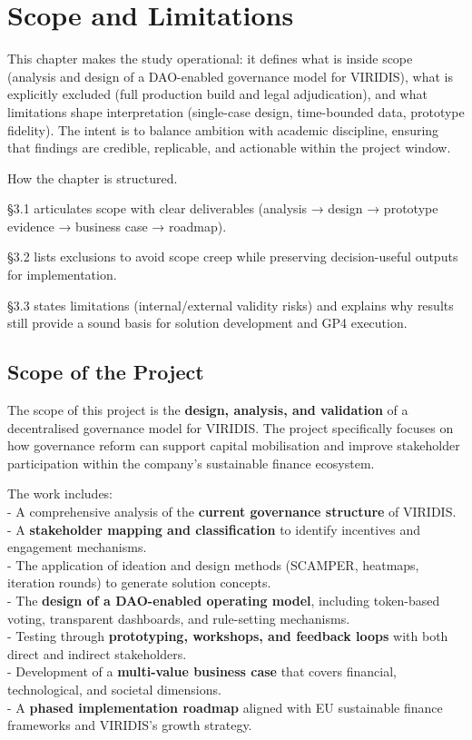 \documentclass[
  english,
  12pt,
  oneside,
  open=any]{scrbook}
\begin{document}
\chapter{Scope and Limitations}\label{sec-scope}

This chapter makes the study operational: it defines what is inside
scope (analysis and design of a DAO-enabled governance model for
VIRIDIS), what is explicitly excluded (full production build and legal
adjudication), and what limitations shape interpretation (single-case
design, time-bounded data, prototype fidelity). The intent is to balance
ambition with academic discipline, ensuring that findings are credible,
replicable, and actionable within the project window.

How the chapter is structured.

§3.1 articulates scope with clear deliverables (analysis → design →
prototype evidence → business case → roadmap).

§3.2 lists exclusions to avoid scope creep while preserving
decision-useful outputs for implementation.

§3.3 states limitations (internal/external validity risks) and explains
why results still provide a sound basis for solution development and GP4
execution.

\section{Scope of the Project}\label{sec-in}

The scope of this project is the \textbf{design, analysis, and
validation} of a decentralised governance model for VIRIDIS. The project
specifically focuses on how governance reform can support capital
mobilisation and improve stakeholder participation within the company's
sustainable finance ecosystem.

The work includes:\\
- A comprehensive analysis of the \textbf{current governance structure}
of VIRIDIS.\\
- A \textbf{stakeholder mapping and classification} to identify
incentives and engagement mechanisms.\\
- The application of ideation and design methods (SCAMPER, heatmaps,
iteration rounds) to generate solution concepts.\\
- The \textbf{design of a DAO-enabled operating model}, including
token-based voting, transparent dashboards, and rule-setting
mechanisms.\\
- Testing through \textbf{prototyping, workshops, and feedback loops}
with both direct and indirect stakeholders.\\
- Development of a \textbf{multi-value business case} that covers
financial, technological, and societal dimensions.\\
- A \textbf{phased implementation roadmap} aligned with EU sustainable
finance frameworks and VIRIDIS's growth strategy.
\end{document}
